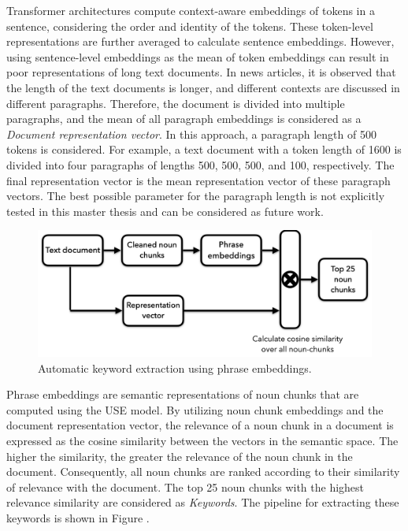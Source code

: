 Transformer architectures compute context-aware embeddings of tokens in a sentence, considering the order and identity of the tokens. These token-level representations are further averaged to calculate sentence embeddings. However, using sentence-level embeddings as the mean of token embeddings can result in poor representations of long text documents. In news articles, it is observed that the length of the text documents is longer, and different contexts are discussed in different paragraphs. Therefore, the document is divided into multiple paragraphs, and the mean of all paragraph embeddings is considered as a \textit{Document representation vector}. In this approach, a paragraph length of 500 tokens is considered. For example, a text document with a token length of 1600 is divided into four paragraphs of lengths 500, 500, 500, and 100, respectively. The final representation vector is the mean representation vector of these paragraph vectors. The best possible parameter for the paragraph length is not explicitly tested in this master thesis and can be considered as future work.



\begin{figure}[h]
	\centering
	\includegraphics[width=.9\textwidth]{images/thesis_images/keyword_extraction.png}
	\caption[Contextualized automatic keyword extraction.]{Automatic keyword extraction using phrase embeddings. \label{fig:keyword_extraction}}
\end{figure}


Phrase embeddings are semantic representations of noun chunks that are computed using the USE model. By utilizing noun chunk embeddings and the document representation vector, the relevance of a noun chunk in a document is expressed as the cosine similarity between the vectors in the semantic space. The higher the similarity, the greater the relevance of the noun chunk in the document. Consequently, all noun chunks are ranked according to their similarity of relevance with the document. The top 25 noun chunks with the highest relevance similarity are considered as \textit{Keywords}. The pipeline for extracting these keywords is shown in Figure .


